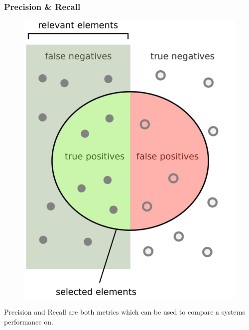 \documentclass[
../../NLP4W_Summary.tex,
]
{subfiles}
\begin{document}
\subsubsection{Precision \& Recall}
\begin{figure}
    [htp]
    \centering
    \includegraphics[scale=0.3]{Pics/RetrievedDocuments.png}
\end{figure}

Precision and Recall are both metrics which can be used to compare a systems performance on.
\end{document}
